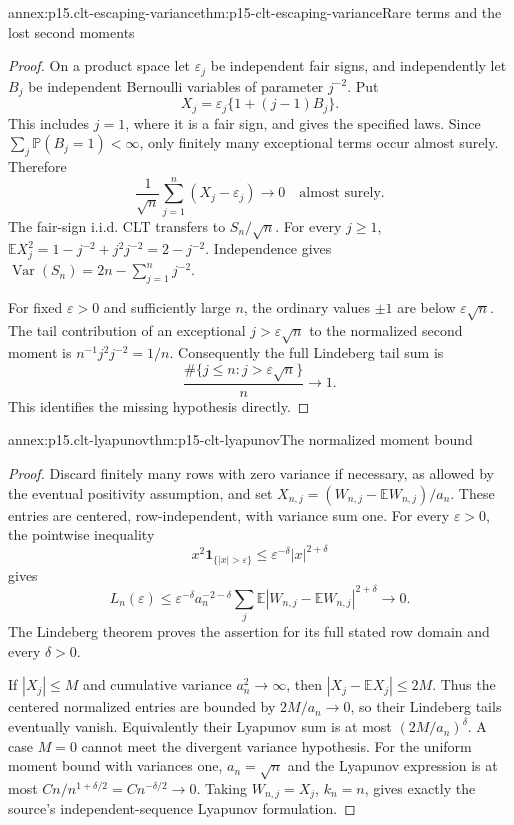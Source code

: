 \begin{annexitem}{annex:p15.clt-escaping-variance}{thm:p15-clt-escaping-variance}{Rare terms and the lost second moments}
\begin{proof}
On a product space let \(\varepsilon_j\) be independent fair signs,
and independently let \(B_j\) be independent Bernoulli variables
of parameter \(j^{-2}\). Put
\[
 X_j=\varepsilon_j\{1+(j-1)B_j\}.
 \]
This includes \(j=1\), where it is a fair sign, and gives the
specified laws. Since \(\sum_j\mathbb P(B_j=1)<\infty\),
only finitely many exceptional terms occur almost surely.
Therefore
\[
 \frac1{\sqrt n}\sum_{j=1}^n(X_j-\varepsilon_j)\longrightarrow0
                                                   \quad\text{almost surely}.
 \]
The fair-sign i.i.d. CLT transfers to \(S_n/\sqrt n\).
For every \(j\geq1\),
\(\mathbb EX_j^2=1-j^{-2}+j^2j^{-2}=2-j^{-2}\).
Independence gives
\(\operatorname{Var}(S_n)=2n-\sum_{j=1}^nj^{-2}\).

For fixed \(\varepsilon>0\) and sufficiently large \(n\),
the ordinary values \(\pm1\) are below \(\varepsilon\sqrt n\).
The tail contribution of an exceptional \(j>\varepsilon\sqrt n\)
to the normalized second moment is
\(n^{-1}j^2j^{-2}=1/n\).
Consequently the full Lindeberg tail sum is
\[
 \frac{\#\{j\leq n:j>\varepsilon\sqrt n\}}n\longrightarrow1.
 \]
This identifies the missing hypothesis directly.
\end{proof}
\end{annexitem}

\begin{annexitem}{annex:p15.clt-lyapunov}{thm:p15-clt-lyapunov}{The normalized moment bound}
\begin{proof}
Discard finitely many rows with zero variance if necessary, as
allowed by the eventual positivity assumption, and set
\(X_{n,j}=(W_{n,j}-\mathbb EW_{n,j})/a_n\).
These entries are centered, row-independent, with variance sum one.
For every \(\varepsilon>0\), the pointwise inequality
\[
 x^2\mathbf1_{\{|x|>\varepsilon\}}
       \leq\varepsilon^{-\delta}|x|^{2+\delta}
 \]
gives
\[
 L_n(\varepsilon)
 \leq\varepsilon^{-\delta}a_n^{-2-\delta}
       \sum_j\mathbb E|W_{n,j}-\mathbb EW_{n,j}|^{2+\delta}\to0.
 \]
The Lindeberg theorem proves the assertion for its full stated
row domain and every \(\delta>0\).

If \(|X_j|\leq M\) and cumulative variance \(a_n^2\to\infty\),
then \(|X_j-\mathbb EX_j|\leq2M\). Thus the centered normalized
entries are bounded by \(2M/a_n\to0\), so their Lindeberg tails
eventually vanish. Equivalently their Lyapunov sum is at most
\((2M/a_n)^\delta\). A case \(M=0\) cannot meet the divergent
variance hypothesis.
For the uniform moment bound with variances one,
\(a_n=\sqrt n\) and the Lyapunov expression is at most
\(Cn/n^{1+\delta/2}=Cn^{-\delta/2}\to0\).
Taking \(W_{n,j}=X_j\), \(k_n=n\), gives exactly the source's
independent-sequence Lyapunov formulation.
\end{proof}
\end{annexitem}

